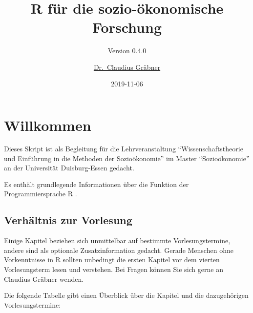 \documentclass[]{book}
\title{R für die sozio-ökonomische Forschung}
\subtitle{Version 0.4.0}
\author{\href{http://claudius-graebner.com/}{Dr.~Claudius Gräbner}}
\date{2019-11-06}
\begin{document}
\maketitle

{
\setcounter{tocdepth}{1}
\tableofcontents
}
\chapter*{Willkommen}\label{willkommen}

Dieses Skript ist als Begleitung für die Lehrveranstaltung
``Wissenschaftstheorie und Einführung in die Methoden der
Sozioökonomie'' im Master ``Sozioökonomie'' an der Universität
Duisburg-Essen gedacht.

Es enthält grundlegende Informationen über die Funktion der
Programmiersprache R \citep{R-Team}.

\section*{Verhältnis zur Vorlesung}\label{verhaltnis-zur-vorlesung}

Einige Kapitel beziehen sich unmittelbar auf bestimmte
Vorlesungstermine, andere sind als optionale Zusatzinformation gedacht.
Gerade Menschen ohne Vorkenntnisse in R sollten unbedingt die ersten
Kapitel vor dem vierten Vorlesungsterm lesen und verstehen. Bei Fragen
können Sie sich gerne an Claudius Gräbner wenden.

Die folgende Tabelle gibt einen Überblick über die Kapitel und die
dazugehörigen Vorlesungstermine:
\end{document}
